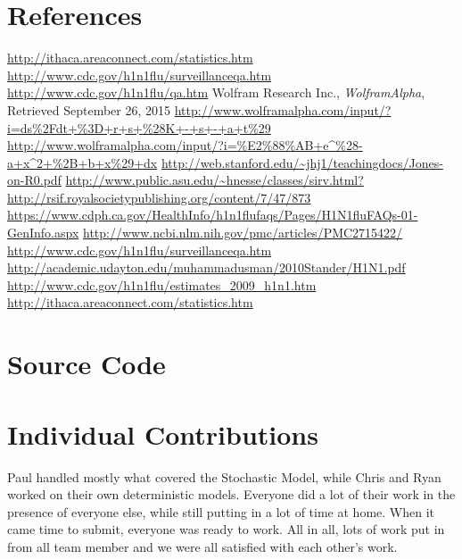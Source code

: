 \documentclass[titlepage]{article}
\begin{document}
\section{References}
	\begin{thebibliography}{9}
		\url{http://ithaca.areaconnect.com/statistics.htm}
		\url{http://www.cdc.gov/h1n1flu/surveillanceqa.htm}
		\url{http://www.cdc.gov/h1n1flu/qa.htm}
		Wolfram Research Inc.,
		\emph{WolframAlpha},
		Retrieved September 26, 2015
		\url{http://www.wolframalpha.com/input/?i=ds%2Fdt+%3D+r+s+%28K+-+s+-+a+t%29}
		\url{http://www.wolframalpha.com/input/?i=%E2%88%AB+e^%28-a+x^2+%2B+b+x%29+dx}
		\url{http://web.stanford.edu/~jhj1/teachingdocs/Jones-on-R0.pdf}
		\url{http://www.public.asu.edu/~hnesse/classes/sirv.html?}
		\url{http://rsif.royalsocietypublishing.org/content/7/47/873}
		\url{https://www.cdph.ca.gov/HealthInfo/h1n1flufaqs/Pages/H1N1fluFAQs-01-GenInfo.aspx}
		\url{http://www.ncbi.nlm.nih.gov/pmc/articles/PMC2715422/}
		\url{http://www.cdc.gov/h1n1flu/surveillanceqa.htm}
        \url{http://academic.udayton.edu/muhammadusman/2010Stander/H1N1.pdf}
        \url{http://www.cdc.gov/h1n1flu/estimates_2009_h1n1.htm}
        \url{http://ithaca.areaconnect.com/statistics.htm}
	\end{thebibliography}

\section{Source Code}
	
	
	
	
	
	
	

\section{Individual Contributions}
	Paul handled mostly what covered the Stochastic Model, while Chris and Ryan worked on their own deterministic models. Everyone did a lot of their work in the presence of everyone else, while still putting in a lot of time at home. When it came time to submit, everyone was ready to work. All in all, lots of work put in from all team member and we were all satisfied with each other's work.
\end{document}
